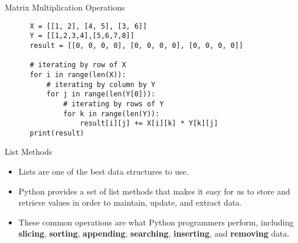 \documentclass[../main.tex]{subfiles}
\begin{document}
\begin{frame}[fragile]{Matrix Multiplication Operations}
  \begin{exercise}{}
    \begin{lstlisting}
      X = [[1, 2], [4, 5], [3, 6]]
      Y = [[1,2,3,4],[5,6,7,8]]
      result = [[0, 0, 0, 0], [0, 0, 0, 0], [0, 0, 0, 0]]

      # iterating by row of X
      for i in range(len(X)):
          # iterating by column by Y
          for j in range(len(Y[0])):
              # iterating by rows of Y
              for k in range(len(Y)):
                  result[i][j] += X[i][k] * Y[k][j]
      print(result) 
    \end{lstlisting}
  \end{exercise}
\end{frame}

\begin{frame}{List Methods}
  \begin{itemize}\parskip3mm \justifying
  \item   Lists are one of the best data structures to use. 
  \item Python provides a set of list methods that makes it easy for us to store and retrieve values in order to maintain, update,
and extract data. 
\item These common operations are what Python programmers perform, including \textbf{slicing}, \textbf{sorting}, \textbf{appending}, \textbf{searching}, \textbf{inserting}, and \textbf{removing} data.
\end{itemize}

\end{frame}
\end{document}
